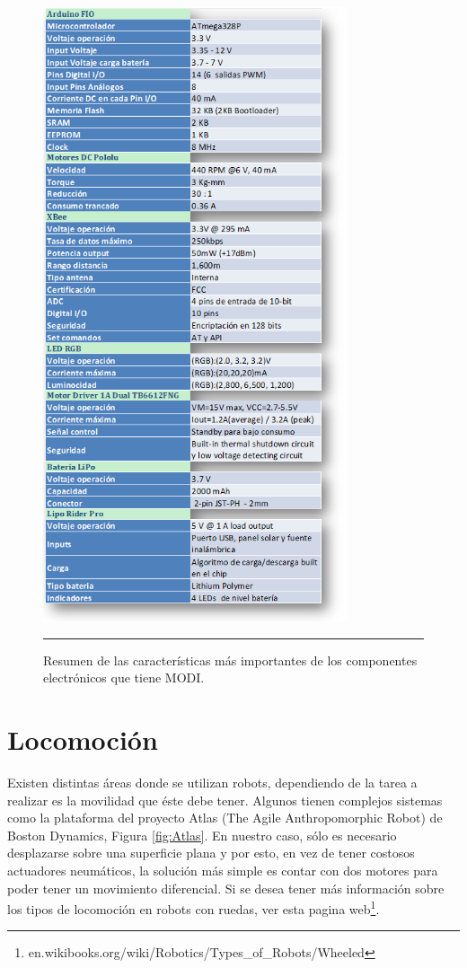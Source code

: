 \begin{figure}[htbp]
	\centering
		\includegraphics[width=0.8\textwidth]{./Figures/MODI/comparacionElo.png}
		\rule{35em}{0.5pt}
	\caption[Tabla caracteristicas más importantes de los componentes Eléctronicos]{Resumen de las características más importantes de los componentes electrónicos que tiene MODI.}
	\label{fig:TablaElo}
\end{figure}



\section{Locomoción}
Existen distintas áreas donde se utilizan robots, dependiendo de la tarea a realizar es la movilidad que éste debe tener. Algunos tienen complejos sistemas como la plataforma del proyecto Atlas (The Agile Anthropomorphic Robot) de Boston Dynamics, Figura \ref{fig:Atlas}. En nuestro caso, sólo es necesario desplazarse sobre una superficie plana y por esto, en vez de tener costosos actuadores neumáticos, la solución más simple es contar con dos motores para poder tener un movimiento diferencial. Si se desea tener más información sobre los tipos de locomoción en robots con ruedas, ver esta pagina web\footnote{en.wikibooks.org/wiki/Robotics/Types\_of\_Robots/Wheeled}.


